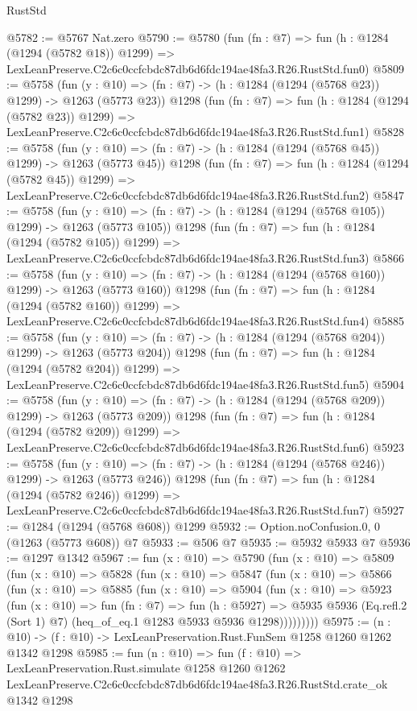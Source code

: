 \begin{lexlean}{RustStd}
\begin{coremodule}
@5782 := @5767 Nat.zero
@5790 := @5780
    (fun (fn : @7) =>
    fun (h : @1284 (@1294 (@5782 @18)) @1299) =>
    LexLeanPreserve.C2c6c0ccfcbdc87db6d6fdc194ae48fa3.R26.RustStd.fun0)
@5809 := @5758
    (fun (y : @10) => (fn : @7) -> (h : @1284 (@1294 (@5768 @23)) @1299) -> @1263 (@5773 @23))
    @1298
    (fun (fn : @7) =>
    fun (h : @1284 (@1294 (@5782 @23)) @1299) =>
    LexLeanPreserve.C2c6c0ccfcbdc87db6d6fdc194ae48fa3.R26.RustStd.fun1)
@5828 := @5758
    (fun (y : @10) => (fn : @7) -> (h : @1284 (@1294 (@5768 @45)) @1299) -> @1263 (@5773 @45))
    @1298
    (fun (fn : @7) =>
    fun (h : @1284 (@1294 (@5782 @45)) @1299) =>
    LexLeanPreserve.C2c6c0ccfcbdc87db6d6fdc194ae48fa3.R26.RustStd.fun2)
@5847 := @5758
    (fun (y : @10) => (fn : @7) -> (h : @1284 (@1294 (@5768 @105)) @1299) -> @1263 (@5773 @105))
    @1298
    (fun (fn : @7) =>
    fun (h : @1284 (@1294 (@5782 @105)) @1299) =>
    LexLeanPreserve.C2c6c0ccfcbdc87db6d6fdc194ae48fa3.R26.RustStd.fun3)
@5866 := @5758
    (fun (y : @10) => (fn : @7) -> (h : @1284 (@1294 (@5768 @160)) @1299) -> @1263 (@5773 @160))
    @1298
    (fun (fn : @7) =>
    fun (h : @1284 (@1294 (@5782 @160)) @1299) =>
    LexLeanPreserve.C2c6c0ccfcbdc87db6d6fdc194ae48fa3.R26.RustStd.fun4)
@5885 := @5758
    (fun (y : @10) => (fn : @7) -> (h : @1284 (@1294 (@5768 @204)) @1299) -> @1263 (@5773 @204))
    @1298
    (fun (fn : @7) =>
    fun (h : @1284 (@1294 (@5782 @204)) @1299) =>
    LexLeanPreserve.C2c6c0ccfcbdc87db6d6fdc194ae48fa3.R26.RustStd.fun5)
@5904 := @5758
    (fun (y : @10) => (fn : @7) -> (h : @1284 (@1294 (@5768 @209)) @1299) -> @1263 (@5773 @209))
    @1298
    (fun (fn : @7) =>
    fun (h : @1284 (@1294 (@5782 @209)) @1299) =>
    LexLeanPreserve.C2c6c0ccfcbdc87db6d6fdc194ae48fa3.R26.RustStd.fun6)
@5923 := @5758
    (fun (y : @10) => (fn : @7) -> (h : @1284 (@1294 (@5768 @246)) @1299) -> @1263 (@5773 @246))
    @1298
    (fun (fn : @7) =>
    fun (h : @1284 (@1294 (@5782 @246)) @1299) =>
    LexLeanPreserve.C2c6c0ccfcbdc87db6d6fdc194ae48fa3.R26.RustStd.fun7)
@5927 := @1284 (@1294 (@5768 @608)) @1299
@5932 := Option.noConfusion.{0, 0} (@1263 (@5773 @608)) @7
@5933 := @506 @7
@5935 := @5932 @5933 @7
@5936 := @1297 @1342
@5967 := fun (x : @10) =>
  @5790
    (fun (x : @10) =>
    @5809
      (fun (x : @10) =>
      @5828
        (fun (x : @10) =>
        @5847
          (fun (x : @10) =>
          @5866
            (fun (x : @10) =>
            @5885
              (fun (x : @10) =>
              @5904
                (fun (x : @10) =>
                @5923
                  (fun (x : @10) =>
                  fun (fn : @7) =>
                  fun (h : @5927) =>
                  @5935
                    @5936
                    (Eq.refl.{2} (Sort 1) @7)
                    (heq_of_eq.{1} @1283 @5933 @5936 @1298)))))))))
@5975 := (n : @10) -> (f : @10) -> LexLeanPreservation.Rust.FunSem @1258 @1260 @1262 @1342 @1298
@5985 := fun (n : @10) =>
  fun (f : @10) =>
  LexLeanPreservation.Rust.simulate
    @1258
    @1260
    @1262
    LexLeanPreserve.C2c6c0ccfcbdc87db6d6fdc194ae48fa3.R26.RustStd.crate_ok
    @1342
    @1298
\end{coremodule}
\end{lexlean}
